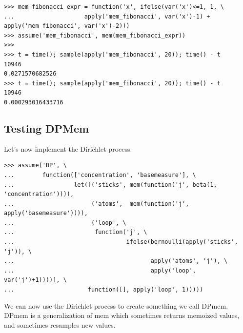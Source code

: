 \documentclass[11pt]{article}
\begin{document}
\begin{small}
\begin{verbatim}
>>> mem_fibonacci_expr = function('x', ifelse(var('x')<=1, 1, \
...                    apply('mem_fibonacci', var('x')-1) + apply('mem_fibonacci', var('x')-2)))
>>> assume('mem_fibonacci', mem(mem_fibonacci_expr))
>>>
>>> t = time(); sample(apply('mem_fibonacci', 20)); time() - t
10946
0.0271570682526
>>> t = time(); sample(apply('mem_fibonacci', 20)); time() - t
10946
0.000293016433716
\end{verbatim}
\end{small}

\subsection{Testing DPMem}

Let's now implement the Dirichlet process.  

\begin{small}
\begin{verbatim}
>>> assume('DP', \
...        function(['concentration', 'basemeasure'], \
...                 let([('sticks', mem(function('j', beta(1, 'concentration')))),
...                      ('atoms',  mem(function('j', apply('basemeasure')))),
...                      ('loop', \
...                       function('j', \
...                                ifelse(bernoulli(apply('sticks', 'j')), \
...                                       apply('atoms', 'j'), \
...                                       apply('loop', var('j')+1))))], \
...                     function([], apply('loop', 1)))))  
\end{verbatim}
\end{small}

We can now use the Dirichlet process to create something we call DPmem.  DPmem is a generalization of mem which sometimes returns memoized values, and sometimes resamples new values.  
\end{document}

